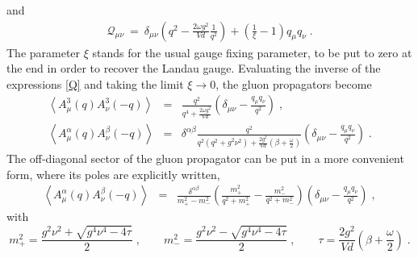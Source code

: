 and
\begin{eqnarray}
\mathcal{Q}_{\mu \nu } ~=~ \delta_{\mu \nu }\left( q^{2} - \frac{2\omega
g^{2}}{Vd}\frac{1}{q^{2}}\right) +\left( \frac{1}{\xi }-1\right) q_{\mu }q_{\nu } \;.
\label{Q}
\end{eqnarray}
The parameter $\xi$ stands for the usual gauge fixing parameter, to be put to zero at the end in order to recover the Landau gauge. Evaluating  the inverse of the expressions \eqref{Q} and taking the limit $\xi\rightarrow 0$, the gluon propagators become
\begin{eqnarray}
\left\langle A_{\mu }^{3}(q)A_{\nu }^{3}(-q)\right\rangle &=&\frac{q^{2}}{q^{4}+  \frac{2\omega g^{2}}{Vd} }  \left( \delta _{\mu \nu }-\frac{q_{\mu }q_{\nu}}{q^{2}}\right)  \label{Pdiag} \;, 
\\
\left\langle A_{\mu}^{\alpha}(q) A_{\nu}^{\beta }(-q)\right\rangle  &=&  \delta^{\alpha\beta} 
\frac{q^{2}}{q^{2} \left( q^{2}+g^{2}\nu^{2}\right) +  \frac{2g^{2}}{Vd} \left(  \beta + \frac{\omega}{2}\right)}  
\left(\delta_{\mu\nu} - \frac{q_{\mu}q_{\nu}}{q^{2}}\right)  \;.
\label{NPoff} 
\end{eqnarray}
The off-diagonal sector of the gluon propagator can be put in a more convenient form, where its
poles are explicitly written,
\begin{eqnarray}
\left\langle A_{\mu}^{\alpha}(q) A_{\nu}^{\beta }(-q)\right\rangle 
&=&  \frac{\delta ^{\alpha \beta }}{m^2_+-m^2_-}   \left(  \frac{m^2_+}{q^2+m^2_+} -\frac{m^2_{-}}{q^2+m^2_-}  \right)
\left( \delta _{\mu\nu }-\frac{q_{\mu }q_{\nu }}{q^{2}}\right)  \;,  
\label{NPoff_f1}
\end{eqnarray}
with
\begin{equation}
m^2_+ = \frac{g^2\nu^2 + \sqrt{g^4 \nu^4 - 4 \tau}}{2}  \;,  \qquad m^2_- = \frac{g^2\nu^2 - \sqrt{g^4 \nu^4 - 4 \tau}}{2} 
\;, \qquad  \tau = \frac{2g^2}{Vd} \left( \beta +\frac{\omega}{2} \right)  \;.\label{masses}
\end{equation}



